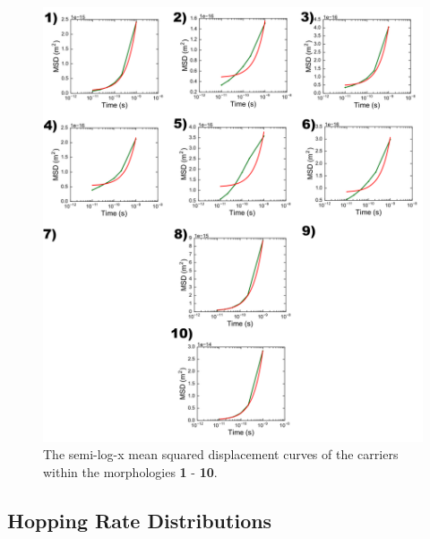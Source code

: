 \documentclass[12pt]{article}
\begin{document}
\begin{figure}[h!]\centering
	\includegraphics[width=\textwidth]{Figures/MSDs.pdf}
    \caption{The semi-log-x mean squared displacement curves of the carriers within the morphologies \textbf{1} - \textbf{10}.}
	\label{fig:MSD}
\end{figure}


\clearpage
\subsection{Hopping Rate Distributions}
\end{document}
